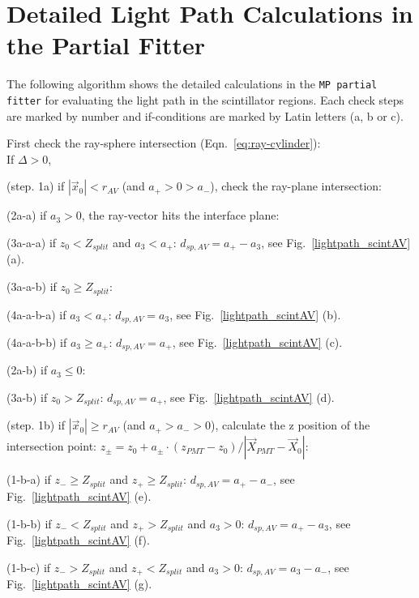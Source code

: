 \section{Detailed Light Path Calculations in the Partial Fitter}\label{appendix:lightpath}
The following algorithm shows the detailed calculations in the \texttt{MP partial fitter} for evaluating the light path in the scintillator regions. Each check steps are marked by number and if-conditions are marked by Latin letters (a, b or c). 

\begin{algorithm}
	First check the ray-sphere intersection (Eqn.~\ref{eq:ray-cylinder}):\\
	If {$\Delta>0$}, 
	
	\hspace{2mm}(step. 1a) if $|\vec{x}_0|<r_{AV}$ (and $a_+>0>a_-$), check the ray-plane intersection:
	
	\hspace{4mm}(2a-a) if $a_3>0$, the ray-vector hits the interface plane: 
	
	\hspace{6mm}(3a-a-a) if $z_0<Z_{split}$ and $a_3<a_+$: $d_{sp,AV}=a_+-a_3$, see Fig.~\ref{lightpath_scintAV} (a).
	
	\hspace{6mm}(3a-a-b) if $z_0\geq Z_{split}$:
	
	\hspace{8mm}(4a-a-b-a) if $a_3<a_+$:  $d_{sp,AV}=a_3$, see Fig.~\ref{lightpath_scintAV} (b). 
	
	\hspace{8mm}(4a-a-b-b) if $a_3\geq a_+$:  $d_{sp,AV}=a_+$, see Fig.~\ref{lightpath_scintAV} (c).
	
	\hspace{4mm}(2a-b) if $a_3\leq0$:
	
	\hspace{6mm}(3a-b) if $z_0>Z_{split}$: $d_{sp,AV}=a_+$, see Fig.~\ref{lightpath_scintAV} (d).
	
	\hspace{2mm}(step. 1b) if $|\vec{x}_0|\geq r_{AV}$ (and $a_+>a_->0$), calculate the z position of the intersection point: $z_{\pm}=z_0+a_\pm\cdot(z_{PMT}-z_0)/|\vec{X}_{PMT}-\vec{X}_0|$:
	
	\hspace{4mm}(1-b-a) if $z_- \geq Z_{split}$ and $z_+\geq Z_{split}$: $d_{sp,AV} = a_+ - a_-$, see Fig.~\ref{lightpath_scintAV} (e).
	
	\hspace{4mm}(1-b-b) if $z_-< Z_{split}$ and $z_+> Z_{split}$ and $a_3>0$: $d_{sp,AV} = a_+ - a_3$, see Fig.~\ref{lightpath_scintAV} (f).
	
	\hspace{4mm}(1-b-c) if $z_->Z_{split}$ and $z_+<Z_{split}$ and $a_3>0$: $d_{sp,AV}= a_3 - a_-$, see Fig.~\ref{lightpath_scintAV} (g).
\end{algorithm}

